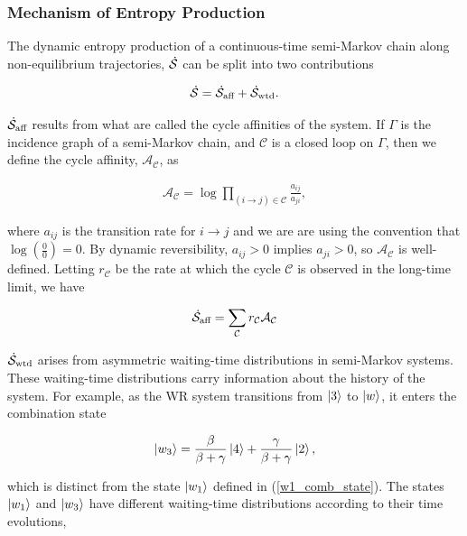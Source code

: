 \subsubsection{Mechanism of Entropy Production}\label{subsection:mechanism-wating-room}

The dynamic entropy production of a continuous-time semi-Markov chain along non-equilibrium trajectories, $\dot{\mathcal{S}}$ can be split into two contributions \cite{martinez2019inferring}

\begin{align}\label{entropy-split}
\dot{\mathcal{S}} = \dot{\mathcal{S}}_{\text{aff}} + \dot{\mathcal{S}}_{\text{wtd}}.
\end{align}

$\dot{\mathcal{S}}_{\text{aff}}$ results from what are called the cycle affinities of the system. If $\Gamma$ is the incidence graph of a semi-Markov chain, and $\mathcal{C}$ is a closed loop on $\Gamma$, then we define the cycle affinity, $\mathcal{A}_{\mathcal{C}}$, as

\begin{align}\label{cycle-affinity}
\mathcal{A}_{\mathcal{C}} = \log \prod_{(i\rightarrow j) \in \mathcal{C}} \frac{a_{ij}}{a_{ji}},
\end{align}

where $a_{ij}$ is the transition rate for $i \rightarrow j$ and we are are using the convention that $\log(\frac{0}{0}) = 0$. By dynamic reversibility, $a_{ij} > 0$ implies $a_{ji} > 0$, so $\mathcal{A}_{\mathcal{C}}$ is well-defined. Letting $r_{\mathcal{C}}$ be the rate at which the cycle $\mathcal{C}$ is observed in the long-time limit, we have \cite{van2022thermodynamic}

\begin{equation}
\dot{\mathcal{S}}_{\text{aff}} = \sum_{\mathcal{C}} r_{\mathcal{C}}\mathcal{A}_{\mathcal{C}}
\end{equation}

$\dot{\mathcal{S}}_{\text{wtd}}$ arises from asymmetric waiting-time distributions in semi-Markov systems. These waiting-time distributions carry information about the history of the system. For example, as the WR system transitions from $\ket{3}$ to $\ket{w}$, it enters the combination state

\begin{align}
\ket{w_3} = \frac{\beta}{\beta+\gamma}\ket{4} + \frac{\gamma}{\beta + \gamma}\ket{2},
\end{align}

which is distinct from the state $\ket{w_1}$ defined in (\ref{w1_comb_state}). The states $\ket{w_1}$ and $\ket{w_3}$ have different waiting-time distributions according to their time evolutions,

